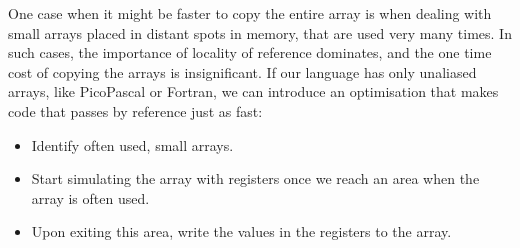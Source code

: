 One case when it might be faster to copy the entire array is when dealing with small arrays placed in distant spots in memory, that are used very many times. In such cases, the importance of locality of reference dominates, and the one time cost of copying the arrays is insignificant. If our language has only unaliased arrays, like PicoPascal or Fortran, we can introduce an optimisation that makes code that passes by reference just as fast:
\begin{itemize}
\item Identify often used, small arrays.
\item Start simulating the array with registers once we reach an area when the array is often used.
\item Upon exiting this area, write the values in the registers to the array.
\end{itemize}
